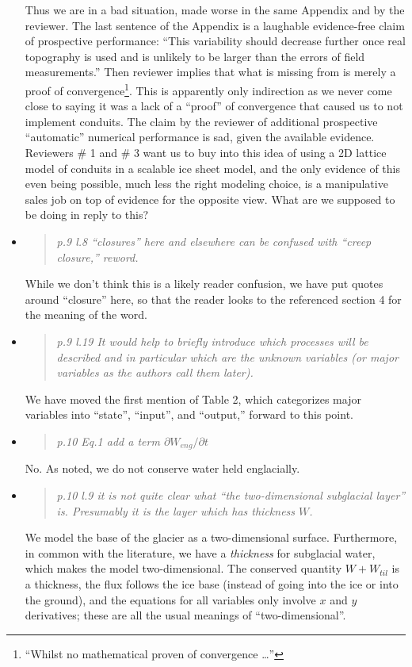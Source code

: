 \documentclass[11pt,reqno]{amsart}
\newcommand{\reply}[2]{
\medskip\medskip
\item  \begin{quote}
\emph{#1}
\end{quote}

\medskip
\noindent #2}
\begin{document}
\begin{itemize}
{\indent Thus we are in a bad situation, made worse in the same Appendix and by the reviewer.  The last sentence of the Appendix is a laughable evidence-free claim of prospective performance: ``This variability should decrease further once real topography is used and is unlikely to be larger than the errors of field measurements.''  Then reviewer implies that what is missing from \cite{Werderetal2013} is merely a proof of convergence\footnote{``Whilst no mathematical proven of convergence \dots''}.  This is apparently only indirection as we never come close to saying it was a lack of a ``proof'' of convergence that caused us to not implement conduits.  The claim by the reviewer of additional prospective ``automatic'' numerical performance is sad, given the available evidence. \\
\indent Reviewers \# 1 and \# 3 want us to buy into this idea of using a 2D lattice model of conduits in a scalable ice sheet model, and the only evidence of this even being possible, much less the right modeling choice, is a manipulative sales job on top of evidence for the opposite view.  What are we supposed to be doing in reply to this?}

\reply{p.9 l.8 ``closures'' here and elsewhere can be confused with ``creep closure,'' reword.}
{While we don't think this is a likely reader confusion, we have put quotes around ``closure'' here, so that the reader looks to the referenced section 4 for the meaning of the word.}

\reply{p.9 l.19 It would help to briefly introduce which processes will be described and in
particular which are the unknown variables (or major variables as the authors call
them later).}
{We have moved the first mention of Table 2, which categorizes major variables into ``state'', ``input'', and ``output,'' forward to this point.}

\reply{p.10 Eq.1 add a term $\partial W_{eng}/\partial t$}
{No.  As noted, we do not conserve water held englacially.}

\reply{p.10 l.9 it is not quite clear what ``the two-dimensional subglacial layer'' is. Presumably it is the layer which has thickness $W$.}
{We model the base of the glacier as a two-dimensional surface.  Furthermore, in common with the literature, we have a \emph{thickness} for subglacial water, which makes the model two-dimensional.  The conserved quantity $W+W_{til}$ is a thickness, the flux follows the ice base (instead of going into the ice or into the ground), and the equations for all variables only involve $x$ and $y$ derivatives; these are all the usual meanings of ``two-dimensional''.}


\end{itemize}
\end{document}

